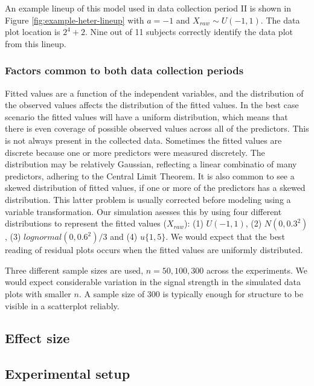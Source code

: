 \documentclass[]{interact}
\theoremstyle{plain}%
\theoremstyle{definition}
\theoremstyle{remark}
\begin{document}
An example lineup of this model used in data collection period II is
shown in Figure \ref{fig:example-heter-lineup} with \(a = -1\) and
\(X_{raw} \sim U(-1, 1)\). The data plot location is \(2^4 + 2\). Nine
out of 11 subjects correctly identify the data plot from this lineup.

\hypertarget{factors-common-to-both-data-collection-periods}{%
\subsubsection{Factors common to both data collection
periods}\label{factors-common-to-both-data-collection-periods}}

Fitted values are a function of the independent variables, and the
distribution of the observed values affects the distribution of the
fitted values. In the best case scenario the fitted values will have a
uniform distribution, which means that there is even coverage of
possible observed values across all of the predictors. This is not
always present in the collected data. Sometimes the fitted values are
discrete because one or more predictors were measured discretely. The
distribution may be relatively Gaussian, reflecting a linear combinatio
of many predictors, adhering to the Central Limit Theorem. It is also
common to see a skewed distribution of fitted values, if one or more of
the predictors has a skewed distribution. This latter problem is usually
corrected before modeling using a variable transformation. Our
simulation asesses this by using four different distributions to
represent the fitted values (\(X_{raw}\)): (1) \(U(-1, 1)\), (2)
\(N(0, 0.3^2)\), (3) \(lognormal(0, 0.6^2)/3\) and (4) \(u\{1, 5\}\). We
would expect that the best reading of residual plots occurs when the
fitted values are uniformly distributed.

Three different sample sizes are used, \(n=50, 100, 300\) across the
experiments. We would expect considerable variation in the signal
strength in the simulated data plots with smaller \(n\). A sample size
of 300 is typically enough for structure to be visible in a scatterplot
reliably.

\hypertarget{effect-size}{%
\subsection{Effect size}\label{effect-size}}

\hypertarget{experimental-setup}{%
\subsection{Experimental setup}\label{experimental-setup}}
\end{document}

